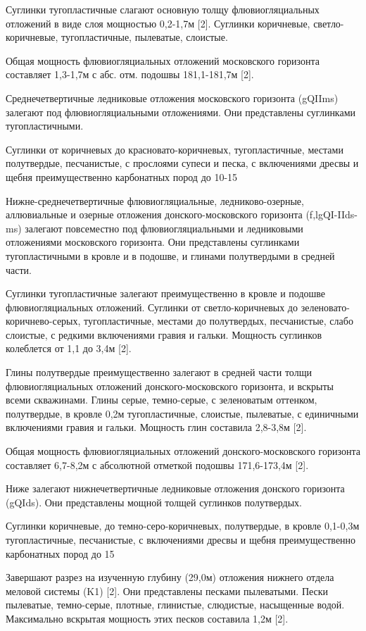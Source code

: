 Суглинки тугопластичные слагают основную толщу флювиогляциальных отложений в виде слоя мощностью 0,2-1,7м [2]. Суглинки коричневые, светло-коричневые, тугопластичные, пылеватые, слоистые.

Общая мощность флювиогляциальных отложений московского горизонта составляет 1,3-1,7м с абс. отм. подошвы 181,1-181,7м [2].

Среднечетвертичные ледниковые отложения московского горизонта (gQIIms) залегают под флювиогляциальными отложениями. Они представлены суглинками тугопластичными.

Суглинки от коричневых до красновато-коричневых, тугопластичные, местами полутвердые, песчанистые, с прослоями супеси и песка, с включениями дресвы и щебня преимущественно карбонатных пород до 10-15%

Нижне-среднечетвертичные флювиогляциальные, ледниково-озерные, аллювиальные и озерные отложения донского-московского горизонта (f,lgQI-IIds-ms) залегают повсеместно под флювиогляциальными и ледниковыми отложениями московского горизонта. Они представлены суглинками тугопластичными в кровле и в подошве, и глинами полутвердыми в средней части.

Суглинки тугопластичные залегают преимущественно в кровле и подошве флювиогляциальных отложений. Суглинки от светло-коричневых до зеленовато-коричнево-серых, тугопластичные, местами до полутвердых, песчанистые, слабо слоистые, с редкими включениями гравия и гальки. Мощность суглинков колеблется от 1,1 до 3,4м [2].

Глины полутвердые преимущественно залегают в средней части толщи флювиогляциальных отложений донского-московского горизонта, и вскрыты всеми скважинами. Глины серые, темно-серые, с зеленоватым оттенком, полутвердые, в кровле 0,2м тугопластичные, слоистые, пылеватые, с единичными включениями гравия и гальки. Мощность глин составила 2,8-3,8м [2].

Общая мощность флювиогляциальных отложений донского-московского горизонта составляет 6,7-8,2м с абсолютной отметкой подошвы 171,6-173,4м [2].

Ниже залегают нижнечетвертичные ледниковые отложения донского горизонта (gQIds). Они представлены мощной толщей суглинков полутвердых.

Суглинки коричневые, до темно-серо-коричневых, полутвердые, в кровле 0,1-0,3м тугопластичные, песчанистые, с включениями дресвы и щебня преимущественно карбонатных пород до 15%

Завершают разрез на изученную глубину (29,0м) отложения нижнего отдела меловой системы (K1) [2]. Они представлены песками пылеватыми. Пески пылеватые, темно-серые, плотные, глинистые, слюдистые, насыщенные водой. Максимально вскрытая мощность этих песков составила 1,2м [2].
